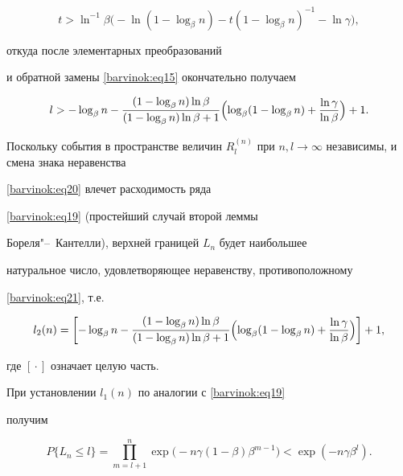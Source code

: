 $$

t>\ln^{-1} \beta \bigl(-\ln (1-\log _\beta n)-t (1-\log _\beta n)^{-1}-\ln \gamma\bigr),

$$ 

откуда после элементарных преобразований

и обратной замены \eqref{barvinok:eq15} окончательно получаем

\begin{equation}

\label{barvinok:eq21} l>-\log _\beta n-\frac{(1-\log_\beta n)\ln

\beta }{(1-\log _\beta n)\ln \beta +1}\Bigl(\log_\beta (1-\log

_\beta n)+\frac{\ln \gamma }{\ln \beta}\Bigr)+1.

\end{equation}

Поскольку события в пространстве величин $R_l^{(n)} $ при $n,l\to

\infty $ независимы, и смена знака неравенства

\eqref{barvinok:eq20} влечет расходимость ряда

\eqref{barvinok:eq19} (простейший случай второй леммы

Бореля"--~Кантелли), верхней границей $L_n $ будет наибольшее

натуральное число, удовлетворяющее неравенству, противоположному

\eqref{barvinok:eq21}, т.е.

\begin{equation}

\label{barvinok:eq22} l_2 (n)=\left[-\log _\beta n-\frac{(1-\log

_\beta n)\ln \beta }{(1-\log _\beta n)\ln \beta +1}\Bigl(\log

_\beta (1-\log _\beta n)+\frac{\ln \gamma}{\ln \beta}

\Bigr)\right]+1,

\end{equation}

где $[{} \cdot {}]$ означает целую часть.



При установлении $l_1 (n)$ по аналогии с \eqref{barvinok:eq19}

получим

\begin{equation}

\label{barvinok:eq23} P\{L_n \le l\}=\prod\limits_{m=l+1}^n \exp \bigl(

-n\gamma (1-\beta)\beta^{m-1}\bigr)<\exp (-n\gamma \beta ^l).

\end{equation}

